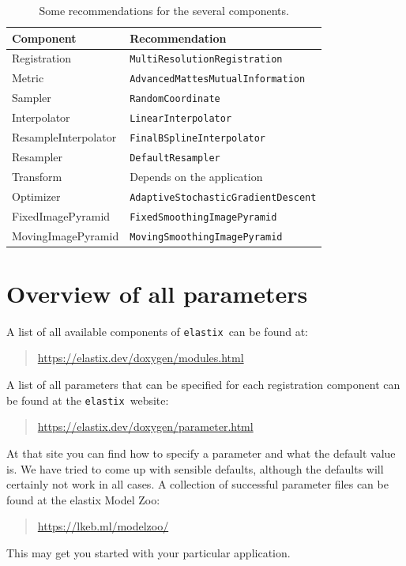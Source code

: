 \documentclass[]{report}
\newcommand{\elastix}{\texttt{elastix}}
\begin{document}
\begin{table}[htb]
\centering
\begin{tabular}{l|p{15em}}
\textbf{Component} & \textbf{Recommendation} \\
\hline
Registration & \texttt{MultiResolutionRegistration} \\
Metric       & \texttt{AdvancedMattesMutualInformation} \\
Sampler      & \texttt{RandomCoordinate} \\
Interpolator & \texttt{LinearInterpolator} \\
ResampleInterpolator & \texttt{FinalBSplineInterpolator} \\
Resampler    & \texttt{DefaultResampler}\\
Transform    & Depends on the application \\
Optimizer    & \texttt{AdaptiveStochasticGradientDescent} \\
FixedImagePyramid   & \texttt{FixedSmoothingImagePyramid} \\
MovingImagePyramid  & \texttt{MovingSmoothingImagePyramid} \\
\end{tabular}
\caption{Some recommendations for the several components.}\label{table:tutorial:components}
\end{table}

\section{Overview of all parameters}

A list of all available components of \elastix\ can be found at:
\begin{quote}
\url{https://elastix.dev/doxygen/modules.html}
\end{quote}
A list of all parameters that can be specified for each registration
component can be found at the \elastix\ website:
\begin{quote}
\url{https://elastix.dev/doxygen/parameter.html}
\end{quote}
At that site you can find how to specify a parameter and what the
default value is. We have tried to come up with sensible defaults,
although the defaults will certainly not work in all cases. A
collection of successful parameter files can be found at the elastix Model Zoo:
\begin{quote}
\url{https://lkeb.ml/modelzoo/}
\end{quote}
This may get you started with your particular application.
\end{document}
